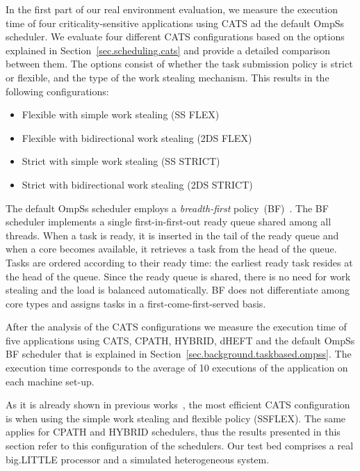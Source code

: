 In the first part of our real environment evaluation, we measure the execution time of four criticality-sensitive applications using CATS ad the default OmpSs scheduler. 
We evaluate four different CATS configurations based on the options explained in Section~\ref{sec.scheduling.cats} and provide a detailed comparison between them. 
The options consist of whether the task submission policy is strict or flexible, and the type of the work stealing mechanism. 
This results in the following configurations:
\begin{itemize}
	\itemsep0em
	\item Flexible with simple work stealing (SS FLEX)
	\item Flexible with bidirectional work stealing (2DS FLEX)
	\item Strict with simple work stealing (SS STRICT)
	\item Strict with bidirectional work stealing (2DS STRICT)
\end{itemize}

The default OmpSs scheduler employs a \textit{breadth-first} policy~(BF)~\cite{Duran_schedulers_08}. The BF scheduler implements a single first-in-first-out ready queue shared among all threads. 
When a task is ready, it is inserted in the tail of the ready queue and when a core becomes available, it retrieves a task from the head of the queue. Tasks are ordered according to their ready time: the earliest ready task resides at the head of the queue. Since the ready queue is shared, there is no need for work stealing and the load is balanced automatically. BF does not differentiate among core types and assigns tasks in a first-come-first-served basis.

After the analysis of the CATS configurations we measure the execution time of five applications using CATS, CPATH, HYBRID, dHEFT and the default OmpSs BF scheduler that is explained in Section~\ref{sec.background.taskbased.ompss}. 
The execution time corresponds to the average of 10 executions of the application on each machine set-up.

As it is already shown in previous works~\cite{Chronaki:ICS2015}, the most efficient CATS configuration is when using the simple work stealing and flexible policy (SSFLEX).
The same applies for CPATH and HYBRID schedulers, thus the results presented in this section refer to this configuration of the schedulers. 
\fi %
Our test bed comprises a real big.LITTLE processor and a simulated heterogeneous system.

